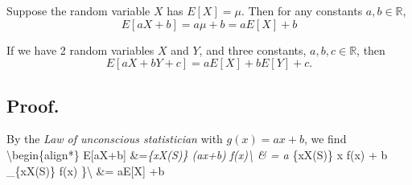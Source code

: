 \documentclass[
]{book}
\theoremstyle{definition}
\theoremstyle{definition}
\theoremstyle{definition}
\theoremstyle{definition}
\theoremstyle{remark}
\begin{document}
Suppose the random variable \(X\) has \(E[X]=\mu\). Then for any constants \(a,b\in\mathbb{R}\),
\[ E[aX+b]= a \mu + b = a E[X]+b\]

If we have 2 random variables \(X\) and \(Y\), and three constants, \(a,b,c\in \mathbb{R}\), then
\[
  E[aX+bY + c] = aE[X] + bE[Y] +c.
\]

\hypertarget{proof.}{%
\subsection{Proof.}\label{proof.}}

By the \emph{Law of unconscious statistician} with \(g(x)=ax+b\), we find
\textbackslash begin\{align*\}
E{[}aX+b{]} \&=\sum\emph{\{x\in X(S)\} (ax+b) f(x)\textbackslash{}
\& = a \cdot  \sum}\{x\in X(S)\} x f(x) + b \cdot \sum\_\{x\in X(S)\} f(x) \}\textbackslash{}
\&= a\cdot  E{[}X{]} +b 

  
\end{document}
